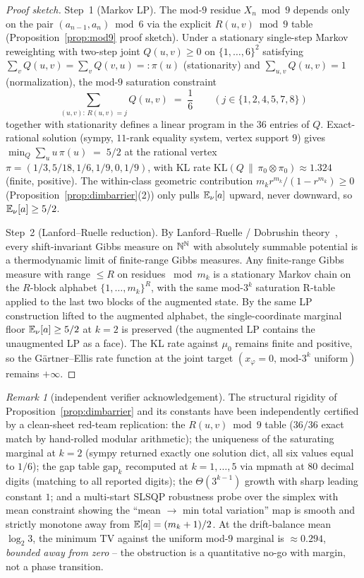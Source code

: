 \documentclass[11pt]{amsart}
\theoremstyle{definition}
\theoremstyle{remark}
\newtheorem{remark}[theorem]{Remark}
\begin{document}
\begin{proof}[Proof sketch]
Step~1 (Markov LP). The mod-$9$ residue $X_n\bmod 9$ depends only on the pair $(a_{n-1},a_n)\bmod 6$
via the explicit $R(u,v)\bmod 9$ table (Proposition~\ref{prop:mod9} proof sketch). Under a stationary
single-step Markov reweighting with two-step joint $Q(u,v)\ge 0$ on $\{1,\dots,6\}^2$ satisfying
$\sum_v Q(u,v)=\sum_v Q(v,u)=:\pi(u)$ (stationarity) and $\sum_{u,v} Q(u,v)=1$ (normalization),
the mod-$9$ saturation constraint
\[
  \sum_{(u,v):\,R(u,v)=j}Q(u,v) \;=\;\frac{1}{6}\qquad(j\in\{1,2,4,5,7,8\})
\]
together with stationarity defines a linear program in the $36$ entries of $Q$. Exact-rational
solution (sympy, $11$-rank equality system, vertex support $9$) gives
$\min_Q \sum_u u\,\pi(u)\;=\;5/2$ at the rational vertex
$\pi=(1/3,5/18,1/6,1/9,0,1/9)$, with KL rate
$\mathrm{KL}(Q\,\|\,\pi_0\otimes\pi_0)\approx 1.324$ (finite, positive). The within-class
geometric contribution $m_k r^{m_k}/(1-r^{m_k})\ge 0$ (Proposition~\textup{\ref{prop:dimbarrier}}(2))
only pulls $\mathbb{E}_\nu[a]$ upward, never downward, so $\mathbb{E}_\nu[a]\ge 5/2$.

Step~2 (Lanford--Ruelle reduction). By Lanford--Ruelle / Dobrushin theory~\citep{lanford1969},
every shift-invariant Gibbs measure on $\mathbb{N}^{\mathbb{N}}$ with absolutely summable potential is a
thermodynamic limit of finite-range Gibbs measures. Any finite-range Gibbs measure with range
$\le R$ on residues $\bmod m_k$ is a stationary Markov chain on the $R$-block alphabet
$\{1,\dots,m_k\}^R$, with the same mod-$3^k$ saturation R-table applied to the last two blocks
of the augmented state. By the same LP construction lifted to the augmented alphabet, the
single-coordinate marginal floor $\mathbb{E}_\nu[a]\ge 5/2$ at $k=2$ is preserved (the augmented LP
contains the unaugmented LP as a face). The KL rate against $\mu_0$ remains finite and positive,
so the G\"artner--Ellis rate function at the joint target $(x_\varphi=0,\,\text{mod-}3^k\text{ uniform})$
remains $+\infty$.
\end{proof}

\begin{remark}[independent verifier acknowledgement]\label{rem:dimbarrier-verifier}
The structural rigidity of Proposition~\ref{prop:dimbarrier} and its constants have been
independently certified by a clean-sheet red-team replication: the $R(u,v)\bmod 9$ table
($36/36$ exact match by hand-rolled modular arithmetic); the uniqueness of the saturating
marginal at $k=2$ (sympy returned exactly one solution dict, all six values equal to $1/6$);
the gap table $\mathrm{gap}_k$ recomputed at $k=1,\dots,5$ via mpmath at $80$ decimal digits
(matching to all reported digits); the $\Theta(3^{k-1})$ growth with sharp leading constant $1$;
and a multi-start SLSQP robustness probe over the simplex with mean constraint showing the
``mean $\to$ min total variation'' map is smooth and strictly monotone away from
$\mathbb{E}[a]=(m_k+1)/2$. At the drift-balance mean $\log_2 3$, the minimum TV against the
uniform mod-$9$ marginal is $\approx 0.294$, \emph{bounded away from zero} -- the
obstruction is a quantitative no-go with margin, not a phase transition.
\end{remark}
\end{document}

